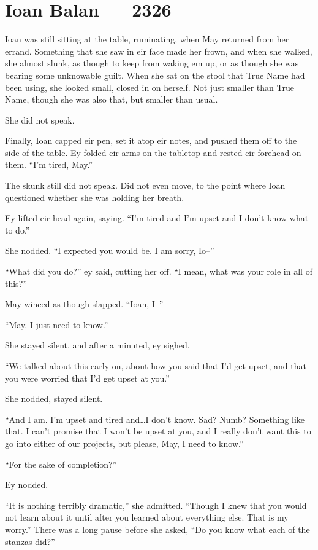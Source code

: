 \hypertarget{ioan-balan-2326}{%
\chapter{Ioan Balan — 2326}\label{ioan-balan-2326}}

Ioan was still sitting at the table, ruminating, when May returned from her errand. Something that she saw in eir face made her frown, and when she walked, she almost slunk, as though to keep from waking em up, or as though she was bearing some unknowable guilt. When she sat on the stool that True Name had been using, she looked small, closed in on herself. Not just smaller than True Name, though she was also that, but smaller than usual.

She did not speak.

Finally, Ioan capped eir pen, set it atop eir notes, and pushed them off to the side of the table. Ey folded eir arms on the tabletop and rested eir forehead on them. ``I'm tired, May.''

The skunk still did not speak. Did not even move, to the point where Ioan questioned whether she was holding her breath.

Ey lifted eir head again, saying. ``I'm tired and I'm upset and I don't know what to do.''

She nodded. ``I expected you would be. I am sorry, Io--''

``What did you do?'' ey said, cutting her off. ``I mean, what was your role in all of this?''

May winced as though slapped. ``Ioan, I--''

``May. I just need to know.''

She stayed silent, and after a minuted, ey sighed.

``We talked about this early on, about how you said that I'd get upset, and that you were worried that I'd get upset at you.''

She nodded, stayed silent.

``And I am. I'm upset and tired and\ldots I don't know. Sad? Numb? Something like that. I can't promise that I won't be upset at you, and I really don't want this to go into either of our projects, but please, May, I need to know.''

``For the sake of completion?''

Ey nodded.

``It is nothing terribly dramatic,'' she admitted. ``Though I knew that you would not learn about it until after you learned about everything else. That is my worry.'' There was a long pause before she asked, ``Do you know what each of the stanzas did?''

